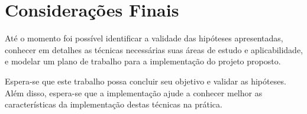 %
%

\chapter{Considerações Finais}

Até o momento foi possível identificar a validade das hipóteses
apresentadas, conhecer em detalhes as técnicas necessárias suas áreas de
estudo e aplicabilidade, e modelar um plano de trabalho para a
implementação do projeto proposto.

Espera-se que este trabalho possa concluir seu objetivo e validar as
hipóteses. Além disso, espera-se que a implementação ajude a conhecer
melhor as características da implementação destas técnicas na prática.
